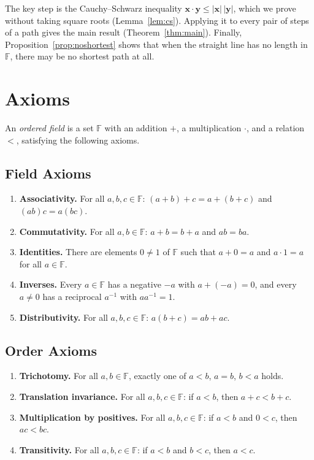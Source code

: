 \documentclass[11pt]{article}
\theoremstyle{plain}
\theoremstyle{definition}
\theoremstyle{remark}
\begin{document}
The key step is the Cauchy--Schwarz inequality $\mathbf{x} \cdot \mathbf{y} \leq |\mathbf{x}|\,|\mathbf{y}|$, which we prove without taking square roots (Lemma~\ref{lem:cs}). Applying it to every pair of steps of a path gives the main result (Theorem~\ref{thm:main}). Finally, Proposition~\ref{prop:noshortest} shows that when the straight line has no length in $\mathbb{F}$, there may be no shortest path at all.

\section{Axioms}\label{sec:axioms}

An \emph{ordered field} is a set $\mathbb{F}$ with an addition $+$, a multiplication $\cdot$, and a relation $<$, satisfying the following axioms.

\subsection{Field Axioms}

\begin{enumerate}
    \item[F1.] \label{ax:F1} \textbf{Associativity.} For all $a, b, c \in \mathbb{F}$: $(a + b) + c = a + (b + c)$ and $(a b) c = a (b c)$.
    \item[F2.] \label{ax:F2} \textbf{Commutativity.} For all $a, b \in \mathbb{F}$: $a + b = b + a$ and $a b = b a$.
    \item[F3.] \label{ax:F3} \textbf{Identities.} There are elements $0 \neq 1$ of $\mathbb{F}$ such that $a + 0 = a$ and $a \cdot 1 = a$ for all $a \in \mathbb{F}$.
    \item[F4.] \label{ax:F4} \textbf{Inverses.} Every $a \in \mathbb{F}$ has a negative $-a$ with $a + (-a) = 0$, and every $a \neq 0$ has a reciprocal $a^{-1}$ with $a a^{-1} = 1$.
    \item[F5.] \label{ax:F5} \textbf{Distributivity.} For all $a, b, c \in \mathbb{F}$: $a (b + c) = a b + a c$.
\end{enumerate}

\subsection{Order Axioms}

\begin{enumerate}
    \item[O1.] \label{ax:O1} \textbf{Trichotomy.} For all $a, b \in \mathbb{F}$, exactly one of $a < b$, $a = b$, $b < a$ holds.
    \item[O2.] \label{ax:O2} \textbf{Translation invariance.} For all $a, b, c \in \mathbb{F}$: if $a < b$, then $a + c < b + c$.
    \item[O3.] \label{ax:O3} \textbf{Multiplication by positives.} For all $a, b, c \in \mathbb{F}$: if $a < b$ and $0 < c$, then $a c < b c$.
    \item[O4.] \label{ax:O4} \textbf{Transitivity.} For all $a, b, c \in \mathbb{F}$: if $a < b$ and $b < c$, then $a < c$.
\end{enumerate}
\end{document}
